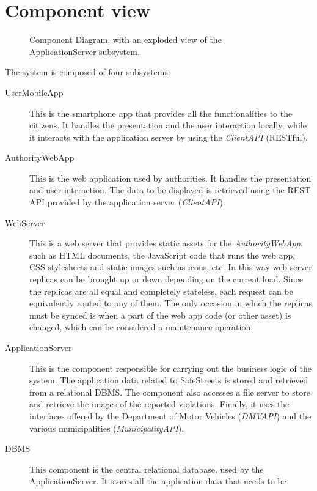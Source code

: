 \section{Component view}
\begin{figure}[t]
    \centering
    \caption{Component Diagram, with an exploded view of the ApplicationServer
    subsystem.}
    \label{fig:component_diagram}
\end{figure}

The system is composed of four subsystems:
\begin{description}
    \item[UserMobileApp] This is the smartphone app that provides all the
    functionalities to the citizens. It handles the presentation and the user
    interaction locally, while it interacts with the application server
    by using the \emph{ClientAPI} (RESTful).
    \item[AuthorityWebApp] This is the web application used by authorities.
    It handles the presentation and user interaction. The data to be displayed
    is retrieved using the REST API provided by the application server
    (\emph{ClientAPI}).
    \item[WebServer] This is a web server that provides static assets for the
    \emph{AuthorityWebApp}, such as HTML documents, the JavaScript code that
    runs the web app, CSS stylesheets and static images such as icons, etc.
    In this way web server replicas can be brought up or down depending on the
    current load. Since the replicas are all equal and completely stateless,
    each request can be equivalently routed to any of them.
    The only occasion in which the replicas must be synced is when a part of
    the web app code (or other asset) is changed, which can be considered a
    maintenance operation.
    \item[ApplicationServer] This is the component responsible for carrying
    out the business logic of the system. The application data related to
    SafeStreets is stored and retrieved from a relational DBMS.
    The component also accesses a file server to store and retrieve the images
    of the reported violations.
    Finally, it uses the interfaces offered by the Department of Motor Vehicles
    (\emph{DMVAPI}) and the various municipalities (\emph{MunicipalityAPI}).
    \item[DBMS] This component is the central relational database, used by the
    ApplicationServer. It stores all the application data that needs to be

\end{description}
